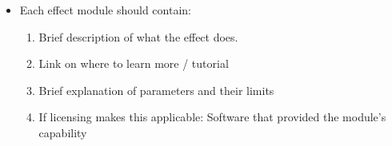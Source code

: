 \begin{itemize}
	\item Each effect module should contain:
	\begin{enumerate}
		\item Brief description of what the effect does.
		\item Link on where to learn more / tutorial
		\item Brief explanation of parameters and their limits
		\item If licensing makes this applicable: Software that provided the module's capability
	\end{enumerate}
	



\end{itemize}